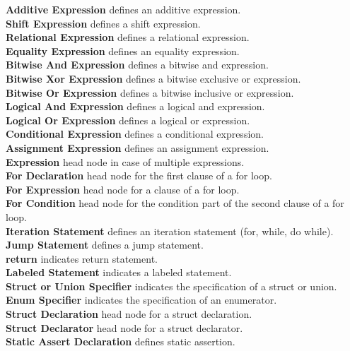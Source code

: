 \documentclass[12pt]{article}
\begin{document}
\begin{multicols}{2}
	\textbf{Additive Expression} defines an additive expression.\\
	\textbf{Shift Expression} defines a shift expression.\\
	\textbf{Relational Expression} defines a relational expression.\\
	\textbf{Equality Expression} defines an equality expression.\\
	\textbf{Bitwise And Expression} defines a bitwise and expression.\\
	\textbf{Bitwise Xor Expression} defines a bitwise exclusive or expression.\\
	\textbf{Bitwise Or Expression} defines a bitwise inclusive or expression.\\
	\textbf{Logical And Expression} defines a logical and expression.\\
	\textbf{Logical Or Expression} defines a logical or expression.\\
	\textbf{Conditional Expression} defines a conditional expression.\\
	\textbf{Assignment Expression} defines an assignment expression.\\
	\textbf{Expression} head node in case of multiple expressions.\\
	\textbf{For Declaration} head node for the first clause of a for loop.\\
	\textbf{For Expression} head node for a clause of a for loop.\\
	\textbf{For Condition} head node for the condition part of the second clause of a for loop.\\
	\textbf{Iteration Statement} defines an iteration statement (for, while, do while).\\
	\textbf{Jump Statement} defines a jump statement.\\
	\textbf{return} indicates return statement.\\
	\textbf{Labeled Statement} indicates a labeled statement.\\
	\textbf{Struct or Union Specifier} indicates the specification of a struct or union.\\
	\textbf{Enum Specifier} indicates the specification of an enumerator.\\
	\textbf{Struct Declaration} head node for a struct declaration.\\
	\textbf{Struct Declarator} head node for a struct declarator.\\
	\textbf{Static Assert Declaration} defines static assertion.\\

\end{multicols}
\end{document}
